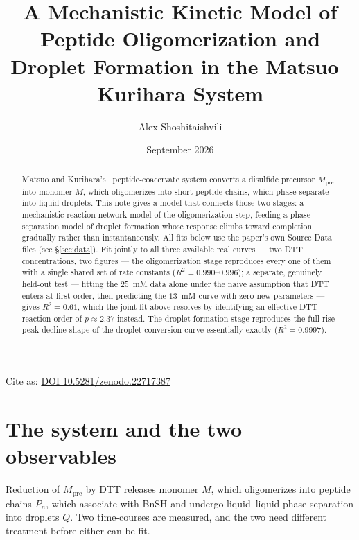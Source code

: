 \documentclass[11pt]{article}
\title{\textbf{A Mechanistic Kinetic Model of Peptide Oligomerization and Droplet Formation in
the Matsuo--Kurihara System}}
\author{Alex Shoshitaishvili}
\date{September 2026}
\begin{document}
\maketitle

\begin{center}
\small Cite as: \href{https://doi.org/10.5281/zenodo.22717387}{DOI 10.5281/zenodo.22717387}
\end{center}

\begin{abstract}
\noindent
Matsuo and Kurihara's~\cite{MK2021} peptide-coacervate system converts a disulfide precursor
$M_{\mathrm{pre}}$ into monomer $M$, which oligomerizes into short peptide chains, which
phase-separate into liquid droplets. This note gives a model that connects those two stages:
a mechanistic reaction-network model of the oligomerization step, feeding a phase-separation
model of droplet formation whose response climbs toward completion gradually rather than
instantaneously. All fits below use the paper's own Source Data files (see \S\ref{sec:data}). Fit jointly to all
three available real curves --- two DTT concentrations, two figures --- the
oligomerization stage reproduces every one of them with a single shared set of rate constants
($R^2=0.990$--$0.996$); a separate, genuinely held-out test --- fitting the $25$~mM data alone
under the naive assumption that DTT enters at first order, then predicting the $13$~mM curve
with zero new parameters --- gives $R^2=0.61$, which the joint fit above resolves by
identifying an effective DTT reaction order of $p\approx2.37$ instead.
The droplet-formation stage reproduces the full rise-peak-decline shape of the
droplet-conversion curve essentially exactly ($R^2=0.9997$).
\end{abstract}

\section{The system and the two observables}
\label{sec:system}

Reduction of $M_{\mathrm{pre}}$ by DTT releases monomer $M$, which oligomerizes into peptide
chains $P_n$, which associate with BnSH and undergo liquid--liquid phase separation into
droplets $Q$. Two time-courses are measured, and the two need different treatment before
either can be fit.
\end{document}
